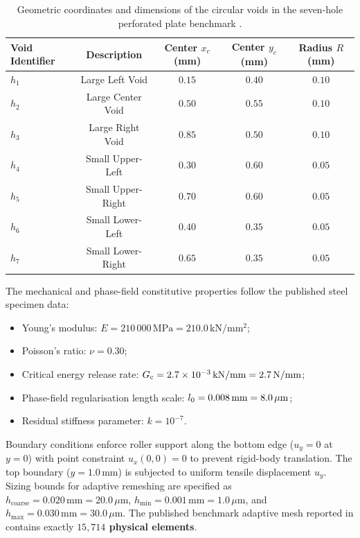 \begin{table}[htbp]
  \centering
  \small
  \caption{Geometric coordinates and dimensions of the circular voids in the seven-hole perforated plate benchmark \citep{pandey2025}.}
  \label{tab:f1726_seven_hole_geometry}
  \begin{tabular}{lcccc}
    \hline
    Void Identifier & Description & Center $x_c$ (mm) & Center $y_c$ (mm) & Radius $R$ (mm) \\
    \hline
    $h_1$ & Large Left Void   & $0.15$ & $0.40$ & $0.10$ \\
    $h_2$ & Large Center Void & $0.50$ & $0.55$ & $0.10$ \\
    $h_3$ & Large Right Void  & $0.85$ & $0.50$ & $0.10$ \\
    $h_4$ & Small Upper-Left  & $0.30$ & $0.60$ & $0.05$ \\
    $h_5$ & Small Upper-Right & $0.70$ & $0.60$ & $0.05$ \\
    $h_6$ & Small Lower-Left  & $0.40$ & $0.35$ & $0.05$ \\
    $h_7$ & Small Lower-Right & $0.65$ & $0.35$ & $0.05$ \\
    \hline
  \end{tabular}
\end{table}

The mechanical and phase-field constitutive properties follow the published steel specimen data:
\begin{itemize}
  \item Young's modulus: $E = 210\,000\,\mathrm{MPa} = 210.0\,\mathrm{kN/mm^2}$;
  \item Poisson's ratio: $\nu = 0.30$;
  \item Critical energy release rate: $G_{\mathrm{c}} = 2.7 \times 10^{-3}\,\mathrm{kN/mm} = 2.7\,\mathrm{N/mm}$;
  \item Phase-field regularisation length scale: $l_0 = 0.008\,\mathrm{mm} = 8.0\,\mu\mathrm{m}$;
  \item Residual stiffness parameter: $k = 10^{-7}$.
\end{itemize}
Boundary conditions enforce roller support along the bottom edge ($u_y = 0$ at $y = 0$) with point constraint $u_x(0,0) = 0$ to prevent rigid-body translation. The top boundary ($y = 1.0\,\mathrm{mm}$) is subjected to uniform tensile displacement $u_y$. Sizing bounds for adaptive remeshing are specified as $h_{\mathrm{coarse}} = 0.020\,\mathrm{mm} = 20.0\,\mu\mathrm{m}$, $h_{\min} = 0.001\,\mathrm{mm} = 1.0\,\mu\mathrm{m}$, and $h_{\max} = 0.030\,\mathrm{mm} = 30.0\,\mu\mathrm{m}$. The published benchmark adaptive mesh reported in \citet[Fig.~27b]{pandey2025} contains exactly \textbf{$15{,}714$ physical elements}.

